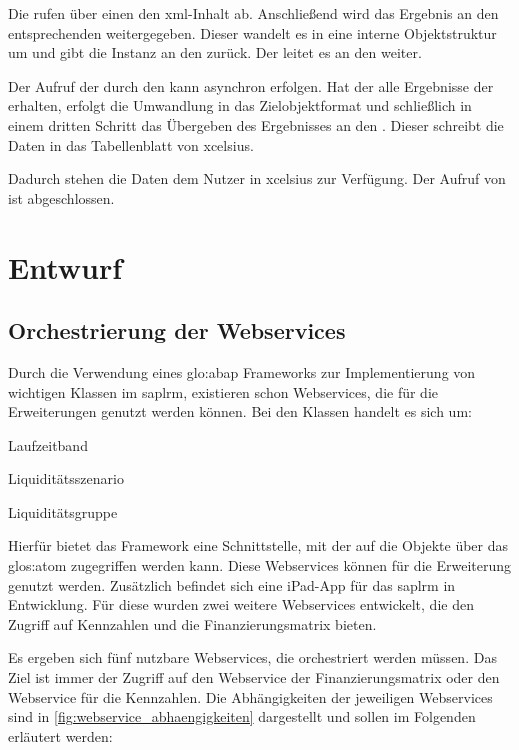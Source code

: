\begin{onehalfspacing}
Die  rufen über einen  den \gls{xml}-Inhalt ab. Anschließend wird das Ergebnis an den entsprechenden  weitergegeben. Dieser wandelt es in eine interne Objektstruktur um und gibt die Instanz an den  zurück. Der  leitet es an den  weiter.

Der Aufruf der  durch den  kann asynchron erfolgen. Hat der  alle Ergebnisse der  erhalten, erfolgt die Umwandlung in das Zielobjektformat und schließlich in einem dritten Schritt das Übergeben des Ergebnisses an den . Dieser schreibt die Daten in das Tabellenblatt von \gls{xcelsius}.

Dadurch stehen die Daten dem Nutzer in \gls{xcelsius} zur Verfügung. Der Aufruf von  ist abgeschlossen.

\section{Entwurf}

\subsection{Orchestrierung der Webservices}
Durch die Verwendung eines \gls{glo:abap} Frameworks zur Implementierung von wichtigen Klassen im \gls{saplrm}, existieren schon Webservices, die für die Erweiterungen genutzt werden können. Bei den Klassen handelt es sich um:

\begin{seList}
\item Laufzeitband
\item Liquiditätsszenario
\item Liquiditätsgruppe
\end{seList}

Hierfür bietet das Framework eine Schnittstelle, mit der auf die Objekte über das \gls{glos:atom} zugegriffen werden kann. Diese Webservices können für die Erweiterung genutzt werden. Zusätzlich befindet sich eine iPad-App für das \gls{saplrm} in Entwicklung. Für diese wurden zwei weitere Webservices entwickelt, die den Zugriff auf Kennzahlen und die Finanzierungsmatrix bieten.

Es ergeben sich fünf nutzbare Webservices, die orchestriert werden müssen. Das Ziel ist immer der Zugriff auf den Webservice der Finanzierungsmatrix oder den Webservice für die Kennzahlen. Die Abhängigkeiten der jeweiligen Webservices sind in \vref{fig:webservice_abhaengigkeiten} dargestellt und sollen im Folgenden erläutert werden:


\end{onehalfspacing}
